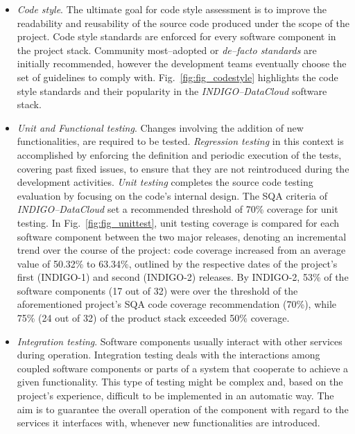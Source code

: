 \documentclass[journal]{IEEEtran}
\begin{document}
\begin{itemize}
\item \textit{Code style}.
The ultimate goal for code style assessment is to improve the readability and reusability of the
source code produced under the scope of the
project. Code style standards are enforced for every software component in the project stack. Community
most--adopted or \textit{de--facto standards} are initially recommended, however the development teams eventually
choose the set of guidelines to comply with. Fig.~\ref{fig:fig_codestyle} highlights the code style standards and
their popularity
in the {\sl INDIGO--DataCloud} software stack.

\item \textit{Unit and Functional testing}.
Changes involving the addition of new functionalities, are required to be tested. \textit{Regression
testing} in this context is accomplished by enforcing the definition and periodic execution
of the tests, covering past fixed issues, to ensure that they are not reintroduced during the development
activities. \textit{Unit testing} completes the source code testing evaluation by focusing on the code's
internal design. The SQA criteria of {\sl INDIGO--DataCloud} set a recommended threshold of 70\% coverage
for unit testing. In Fig.~\ref{fig:fig_unittest}, unit testing coverage is compared for each software
component between the two major releases, denoting an incremental trend over the course of the project:
code coverage increased from an average value of 50.32\% to 63.34\%, outlined by the respective dates of
the project's first (INDIGO-1) and second (INDIGO-2) releases. By INDIGO-2, 53\% of the software components
(17 out of 32) were over the threshold of the aforementioned project's SQA code coverage recommendation
(70\%), while 75\% (24 out of 32) of the product stack exceeded 50\% coverage.

\item \textit{Integration testing}. Software components usually interact with other services during
operation. Integration testing deals with the interactions among coupled software components or
parts of a system that cooperate to achieve a given functionality. This type of testing might be
complex and, based on the project's experience, difficult to be implemented in an automatic way. The aim is to
guarantee the overall operation of the component with regard to the services it interfaces with,
whenever new functionalities are introduced.


\end{itemize}
\end{document}
